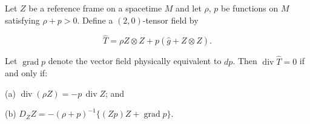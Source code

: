 Let $Z$ be a reference frame on a spacetime $M$ and let $\rho$, $p$ be functions on $M$ satisfying $\rho + p > 0$. Define a $(2,0)$-tensor field by

$$\hat{T} = \rho Z \otimes Z + p(\hat{g} + Z \otimes Z).$$

Let $\operatorname{grad} p$ denote the vector field physically equivalent to $dp$. Then $\operatorname{div} \hat{T} = 0$ if and only if:

(a) $\operatorname{div}(\rho Z) = -p \,\operatorname{div} Z$; and

(b) $D_Z Z = -(\rho + p)^{-1}\{(Zp)Z + \operatorname{grad} p\}$.
